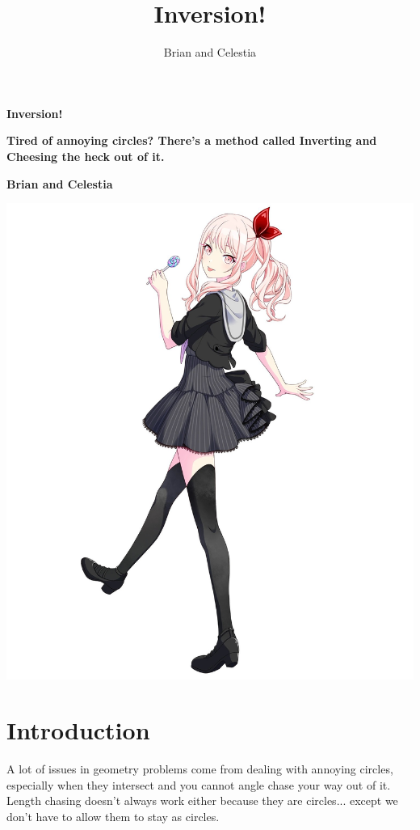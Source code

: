 \documentclass{scrartcl}
\begin{document}
\begin{titlepage}
   \begin{center}
       \vspace*{1.5cm}
       \huge \textbf{Inversion!}

       \vspace{0.5cm}
       \Large \textbf{Tired of annoying circles? There's a method called Inverting and Cheesing the heck out of it.}
            
       \vspace{1.5cm}

       \textbf{Brian and Celestia}

       \vfill
            
        \includegraphics[scale=0.2]{mizuki.jpg}
    \end{center}    
\end{titlepage}
\newpage
\title{Inversion!}
\author{Brian and Celestia}

\section{Introduction}
A lot of issues in geometry problems come from dealing with annoying circles, especially when they intersect and you cannot angle chase your way out of it. Length chasing doesn't always work either because they are circles... except we don't have to allow them to stay as circles.
\end{document}
